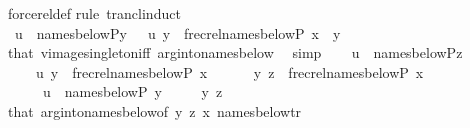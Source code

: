 \begin{isabellebody}
\ forcerel{\isacharunderscore}{\kern0pt}def\isanewline
{}\isamarkupfalse%
{\isacharparenleft}{\kern0pt}rule\ trancl{\isacharunderscore}{\kern0pt}induct{\isacharparenright}{\kern0pt}\isanewline
\ \ \isamarkupfalse%
\ \ {\isachardoublequoteopen}u\ {\isasymin}\ names{\isacharunderscore}{\kern0pt}below{\isacharparenleft}{\kern0pt}P{\isacharcomma}{\kern0pt}y{\isacharparenright}{\kern0pt}{\isachardoublequoteclose}\ \ {\isachardoublequoteopen}\ {\isasymlangle}u{\isacharcomma}{\kern0pt}\ y{\isasymrangle}\ {\isasymin}\ frecrel{\isacharparenleft}{\kern0pt}names{\isacharunderscore}{\kern0pt}below{\isacharparenleft}{\kern0pt}P{\isacharcomma}{\kern0pt}\ x{\isacharparenright}{\kern0pt}{\isacharparenright}{\kern0pt}{\isachardoublequoteclose}\ \ y\isanewline
\ \ \ \ \isamarkupfalse%
\ that\ vimage{\isacharunderscore}{\kern0pt}singleton{\isacharunderscore}{\kern0pt}iff\ arg{\isacharunderscore}{\kern0pt}into{\isacharunderscore}{\kern0pt}names{\isacharunderscore}{\kern0pt}below{}\ \isamarkupfalse%
\ simp\isanewline
{}\isamarkupfalse%
\isanewline
\ \ \isamarkupfalse%
\ {\isachardoublequoteopen}u\ {\isasymin}\ names{\isacharunderscore}{\kern0pt}below{\isacharparenleft}{\kern0pt}P{\isacharcomma}{\kern0pt}z{\isacharparenright}{\kern0pt}{\isachardoublequoteclose}\isanewline
\ \ \ \ \ {\isachardoublequoteopen}{\isasymlangle}u{\isacharcomma}{\kern0pt}\ y{\isasymrangle}\ {\isasymin}\ frecrel{\isacharparenleft}{\kern0pt}names{\isacharunderscore}{\kern0pt}below{\isacharparenleft}{\kern0pt}P{\isacharcomma}{\kern0pt}\ x{\isacharparenright}{\kern0pt}{\isacharparenright}{\kern0pt}{\isacharcircum}{\kern0pt}{\isacharplus}{\kern0pt}{\isachardoublequoteclose}\isanewline
\ \ \ \ \ \ {\isachardoublequoteopen}{\isasymlangle}y{\isacharcomma}{\kern0pt}\ z{\isasymrangle}\ {\isasymin}\ frecrel{\isacharparenleft}{\kern0pt}names{\isacharunderscore}{\kern0pt}below{\isacharparenleft}{\kern0pt}P{\isacharcomma}{\kern0pt}\ x{\isacharparenright}{\kern0pt}{\isacharparenright}{\kern0pt}{\isachardoublequoteclose}\isanewline
\ \ \ \ \ \ {\isachardoublequoteopen}u\ {\isasymin}\ names{\isacharunderscore}{\kern0pt}below{\isacharparenleft}{\kern0pt}P{\isacharcomma}{\kern0pt}\ y{\isacharparenright}{\kern0pt}{\isachardoublequoteclose}\isanewline
\ \ \ \ \ y\ z\isanewline
\ \ \ \ \isamarkupfalse%
\ that\ arg{\isacharunderscore}{\kern0pt}into{\isacharunderscore}{\kern0pt}names{\isacharunderscore}{\kern0pt}below{}{\isacharbrackleft}{\kern0pt}of\ y\ z\ x{\isacharbrackright}{\kern0pt}\ names{\isacharunderscore}{\kern0pt}below{\isacharunderscore}{\kern0pt}tr\ \isamarkupfalse%

\end{isabellebody}
